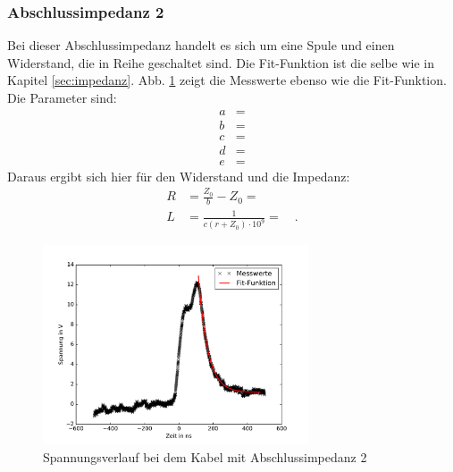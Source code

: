 \subsubsection{Abschlussimpedanz 2}
Bei dieser Abschlussimpedanz handelt es sich um eine Spule und einen Widerstand, die in Reihe geschaltet sind. Die Fit-Funktion ist die selbe wie in Kapitel \ref{sec:impedanz}. Abb. \ref{fig:box23} zeigt die Messwerte ebenso wie die Fit-Funktion. Die Parameter sind:
\begin{align}
	a &=  \\
	b &=  \\
	c &=  \\
	d &=  \\
	e &=  
\end{align}
Daraus ergibt sich hier für den Widerstand und die Impedanz:
\begin{align}
	R &= \frac{Z_0}{b} - Z_0 =  \\
	L &= \frac{1}{ c (r + Z_0) \cdot 10^9} =  \quad.
\end{align}

\begin{figure}
	\centering
	\includegraphics[width=0.7\textwidth]{Box23/Box23.pdf}
	\caption{Spannungsverlauf bei dem Kabel mit Abschlussimpedanz 2}
	\label{fig:box23}
\end{figure}
